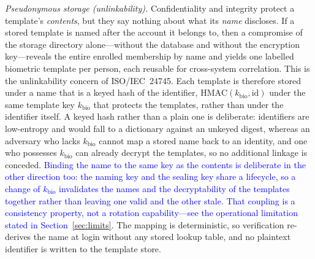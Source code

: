 \documentclass[10pt,journal,compsoc]{IEEEtran}
\begin{document}
{\emph{Pseudonymous storage (unlinkability).} Confidentiality and integrity protect a template's \emph{contents}, but they say nothing about what its \emph{name} discloses. If a stored template is named after the account it belongs to, then a compromise of the storage directory alone---without the database and without the encryption key---reveals the entire enrolled membership by name and yields one labelled biometric template per person, each reusable for cross-system correlation. This is the unlinkability concern of ISO/IEC~24745. Each template is therefore stored under a name that is a keyed hash of the identifier, $\mathrm{HMAC}(k_{\text{bio}},\text{id})$ under the same template key $k_{\text{bio}}$ that protects the templates, rather than under the identifier itself. A keyed hash rather than a plain one is deliberate: identifiers are low-entropy and would fall to a dictionary against an unkeyed digest, whereas an adversary who lacks $k_{\text{bio}}$ cannot map a stored name back to an identity, and one who possesses $k_{\text{bio}}$ can already decrypt the templates, so no additional linkage is conceded. \textcolor{blue}{Binding the name to the same key as the contents is deliberate in the other direction too: the naming key and the sealing key share a lifecycle, so a change of $k_{\text{bio}}$ invalidates the names and the decryptability of the templates together rather than leaving one valid and the other stale. That coupling is a consistency property, not a rotation capability---see the operational limitation stated in Section~\ref{sec:limits}.} The mapping is deterministic, so verification re-derives the name at login without any stored lookup table, and no plaintext identifier is written to the template store.

}
\end{document}
